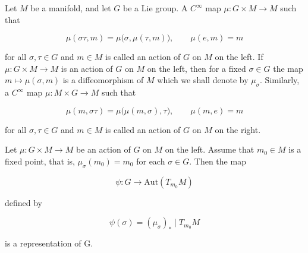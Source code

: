 \begin{definition}\label{thm:3.44}
Let $M$ be a manifold, and let $G$ be a Lie group. A $C^{\infty}$ map $\mu: G \times M \to M$ such that 

\begin{equation}
\tag{1}\label{eq:3.44:1}
\mu(\sigma\tau,m)=\mu\big(\sigma,\mu(\tau,m)\big),\qquad\mu(e,m)=m
\end{equation}

for all $\sigma, \tau \in G$ and $m \in M$ is called an action of $G$ on $M$ on the left. If $\mu: G \times M \to M$ is an action of $G$ on $M$ on the left, then for a fixed $\sigma \in G$ the map $m \mapsto \mu(\sigma, m)$ is a diffeomorphism of $M$ which we shall denote by $\mu_{\sigma}$. Similarly, a $C^{\infty}$ map $\mu: M \times G \to M$ such that 

\begin{equation}
\tag{2}\label{eq:3.44:2}
\mu(m,\sigma\tau)=\mu\big(\mu(m,\sigma),\tau\big),\qquad\mu(m,e)=m
\end{equation}

for all $\sigma, \tau \in G$ and $m \in M$ is called an action of $G$ on $M$ on the right.

\end{definition}

\begin{theorem}\label{thm:3.45}
Let $\mu: G \times M \to M$ be an action of $G$ on $M$ on the left. Assume that $m_0 \in M$ is a fixed point, that is, $\mu_\sigma(m_0) = m_0$ for each $\sigma \in G$. Then the map

\begin{equation}
\tag{1}\label{eq:3.45:1}
\psi\colon G\to\mathrm{Aut}(T_{m_{0}} M)
\end{equation}

defined by

\begin{equation}
\tag{2}\label{eq:3.45:2}
\psi(\sigma)=(\mu_{\sigma})_{*}\mid T_{m_{0}} M
\end{equation}

is a representation of G.

\end{theorem}

